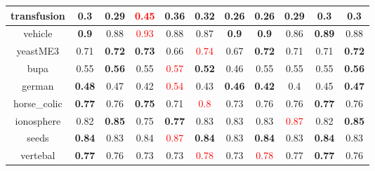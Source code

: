 \documentclass{article}%
\begin{document}
\begin{tabular}{c|cccccccccc}
\hline%
transfusion&\textbf{0.3}&0.29&\textcolor{red}{ 
0.45
}&0.36&\textbf{0.32}&0.26&0.26&\textbf{0.29}&0.3&0.3\\%
\hline%
vehicle&\textbf{0.9}&0.88&\textcolor{red}{ 
0.93
}&0.88&0.87&\textbf{0.9}&\textbf{0.9}&0.86&\textbf{0.89}&0.88\\%
\hline%
yeastME3&0.71&\textbf{0.72}&\textbf{0.73}&0.66&\textcolor{red}{ 
0.74
}&0.67&\textbf{0.72}&0.71&0.71&\textbf{0.72}\\%
\hline%
bupa&0.55&\textbf{0.56}&0.55&\textcolor{red}{ 
0.57
}&\textbf{0.52}&0.46&0.55&0.55&0.55&\textbf{0.56}\\%
\hline%
german&\textbf{0.48}&0.47&0.42&\textcolor{red}{ 
0.54
}&0.43&\textbf{0.46}&\textbf{0.42}&0.4&0.45&\textbf{0.47}\\%
\hline%
horse\_colic&\textbf{0.77}&0.76&\textbf{0.75}&0.71&\textcolor{red}{ 
0.8
}&0.73&0.76&0.76&\textbf{0.77}&0.76\\%
\hline%
ionosphere&0.82&\textbf{0.85}&0.75&\textbf{0.77}&0.83&0.83&0.83&\textcolor{red}{ 
0.87
}&0.82&\textbf{0.85}\\%
\hline%
seeds&\textbf{0.84}&0.83&0.84&\textcolor{red}{ 
0.87
}&\textbf{0.84}&0.83&\textbf{0.84}&0.83&\textbf{0.84}&0.83\\%
\hline%
vertebal&\textbf{0.77}&0.76&0.73&0.73&\textcolor{red}{ 
0.78
}&0.73&\textcolor{red}{ 
0.78
}&0.77&\textbf{0.77}&0.76\\%
\hline%
\end{tabular}

%
\end{document}
